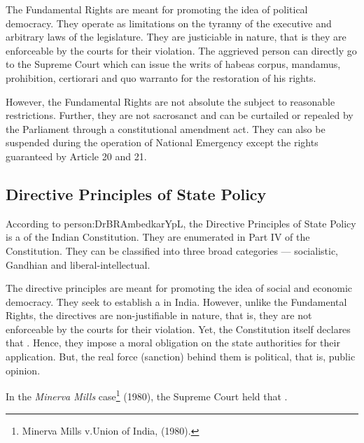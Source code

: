 The Fundamental Rights are meant for promoting the idea of political democracy. They operate as limitations on the tyranny of the executive and arbitrary laws of the legislature. They are justiciable in nature, that is they are enforceable by the courts for their violation. The aggrieved person can directly go to the Supreme Court which can issue the writs of { habeas corpus}, { mandamus}, prohibition, { certiorari} and { quo warranto} for the restoration of his rights.

However, the Fundamental Rights are not absolute the subject to reasonable restrictions. Further, they are not sacrosanct and can be curtailed or repealed by the Parliament through a constitutional amendment act. They can also be suspended during the operation of National Emergency except the rights guaranteed by Article 20 and 21.

\subsection{Directive Principles of State Policy}

According to \gls{person:DrBRAmbedkarYpL}, the Directive Principles of State Policy is a  of the Indian Constitution. They are enumerated in Part IV of the Constitution. They can be classified into three broad categories — socialistic, Gandhian and liberal-intellectual.

The directive principles are meant for promoting the idea of social and economic democracy. They seek to establish a  in India. However, unlike the Fundamental Rights, the directives are non-justifiable in nature, that is, they are not enforceable by the courts for their violation. Yet, the Constitution itself declares that . Hence, they impose a moral obligation on the state authorities for their application. But, the real force (sanction) behind them is political, that is, public opinion.

In the { \textit{Minerva Mills}} case\footnote{Minerva Mills v.Union of India, (1980).} (1980), the Supreme Court held that .

